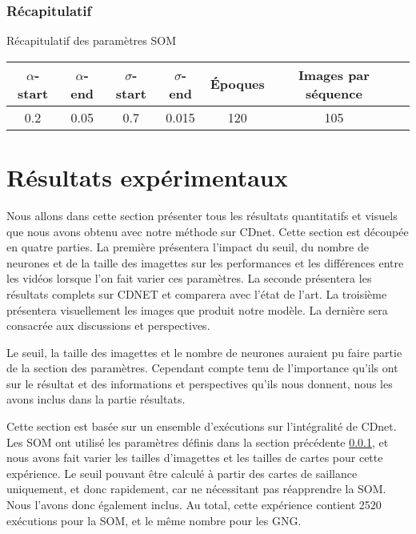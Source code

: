 	\subsubsection{Récapitulatif}\label{sec:param:recap}

	\begin{tableth}
	\caption[Récapitulatif des paramètres SOM]{Récapitulatif des paramètres SOM}
	\begin{tabular}{|cc|cc|c|c|c|}
		\hline
		$\alpha$-start	& $\alpha$-end & $\sigma$-start & $\sigma$-end & Époques & Images par séquence\\
		\hline
		0.2 & 0.05 & 0.7 & 0.015 & 120 & 105\\
		\hline
	\end{tabular}\label{tab:recap:param}
	\end{tableth}


	\newpage

	\section{Résultats expérimentaux}

	Nous allons dans cette section présenter tous les résultats quantitatifs et visuels que nous avons obtenu avec notre méthode sur CDnet. Cette section est découpée en quatre parties. La première présentera l'impact du seuil, du nombre de neurones et de la taille des imagettes sur les performances et les différences entre les vidéos lorsque l'on fait varier ces paramètres. La seconde présentera les résultats complets sur CDNET et comparera avec l'état de l'art. La troisième présentera visuellement les images que produit notre modèle. La dernière sera consacrée aux discussions et perspectives.

	Le seuil, la taille des imagettes et le nombre de neurones auraient pu faire partie de la section des paramètres. Cependant compte tenu de l'importance qu'ils ont sur le résultat et des informations et perspectives qu'ils nous donnent, nous les avons inclus dans la partie résultats.

	Cette section est basée sur un ensemble d'exécutions sur l'intégralité de CDnet. Les SOM ont utilisé les paramètres définis dans la section précédente \ref{sec:param:recap}, et nous avons fait varier les tailles d'imagettes et les tailles de cartes pour cette expérience. Le seuil pouvant être calculé à partir des cartes de saillance uniquement, et donc rapidement, car ne nécessitant pas réapprendre la SOM. Nous l'avons donc également inclus. Au total, cette expérience contient 2520 exécutions pour la SOM, et le même nombre pour les GNG. 

